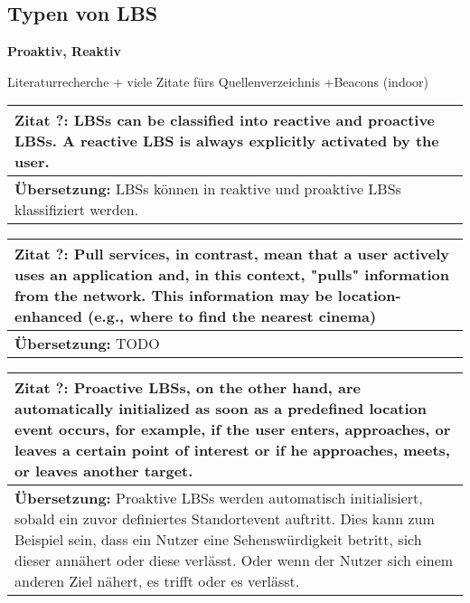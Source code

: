 \subsection{Typen von LBS}

\textbf{Proaktiv, Reaktiv}

Literaturrecherche + viele Zitate fürs Quellenverzeichnis +Beacons (indoor)

\begin{table}[h]
	\centering
	\begin{tabular}{|p{16cm}|}\hline
		\textbf{Zitat ?:} \glqq LBSs can be classified into reactive and proactive LBSs. A reactive LBS is always explicitly activated by the user. \cite[S.3]{Kuepper2005} \\ \hline
		\textbf{Übersetzung:} LBSs können in reaktive und proaktive LBSs klassifiziert werden. \\ \hline
	\end{tabular}
\end{table}


\begin{table}[h]
	\centering
	\begin{tabular}{|p{16cm}|}\hline
		\textbf{Zitat ?:} \glqq Pull services, in contrast, mean that a user actively uses an application and, in this context, "pulls" information from the network. This information may be location-enhanced (e.g., where to find the nearest cinema) \cite[S.20]{Schiller2004} \\ \hline
		\textbf{Übersetzung:} TODO \\ \hline
	\end{tabular}
\end{table}


\begin{table}[h]
	\centering
	\begin{tabular}{|p{16cm}|}\hline
		\textbf{Zitat ?:} \glqq Proactive LBSs, on the other hand, are automatically initialized as soon as a predefined location event occurs, for example, if the user enters, approaches, or leaves a certain point of interest or if he approaches, meets, or leaves another target. \cite[S.3]{Kuepper2005} \\ \hline
		\textbf{Übersetzung:} Proaktive LBSs werden automatisch initialisiert, sobald ein zuvor definiertes Standortevent auftritt. Dies kann zum Beispiel sein, dass ein Nutzer eine Sehenswürdigkeit betritt, sich dieser annähert oder diese verlässt. Oder wenn der Nutzer sich einem anderen Ziel nähert, es trifft oder es verlässt. \\ \hline
	\end{tabular}
\end{table}

